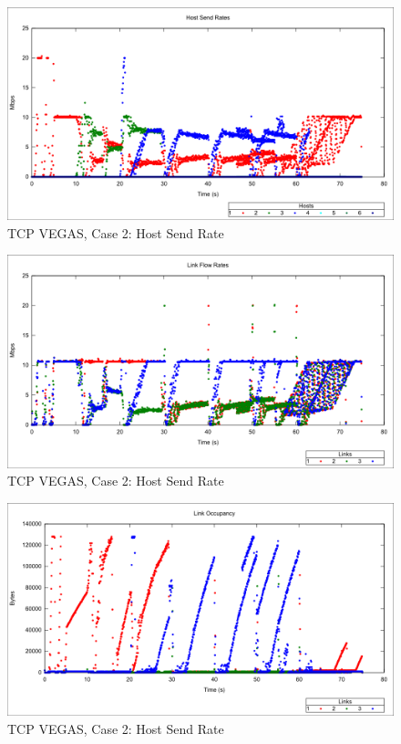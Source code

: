 \begin{figure}[htbp]
    \centering
    \includegraphics[width=\textwidth]{vegas2/Host_Send.png}
    \caption{TCP VEGAS, Case 2: Host Send Rate}
\end{figure}


\begin{figure}[htbp]
    \centering
    \includegraphics[width=\textwidth]{vegas2/Link_Flow_Rate.png}
    \caption{TCP VEGAS, Case 2: Host Send Rate}
\end{figure}

\begin{figure}[htbp]
    \centering
    \includegraphics[width=\textwidth]{vegas2/Link_Occupancy.png}
    \caption{TCP VEGAS, Case 2: Host Send Rate}
\end{figure}

